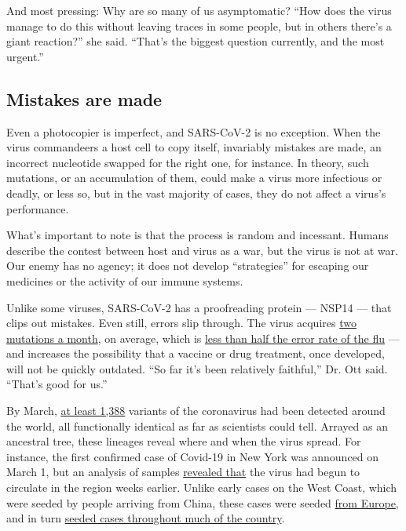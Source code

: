 And most pressing: Why are so many of us asymptomatic? ``How does the
virus manage to do this without leaving traces in some people, but in
others there's a giant reaction?'' she said. ``That's the biggest
question currently, and the most urgent.''

\hypertarget{mistakes-are-made}{%
\subsection{Mistakes are made}\label{mistakes-are-made}}

Even a photocopier is imperfect, and SARS-CoV-2 is no exception. When
the virus commandeers a host cell to copy itself, invariably mistakes
are made, an incorrect nucleotide swapped for the right one, for
instance. In theory, such mutations, or an accumulation of them, could
make a virus more infectious or deadly, or less so, but in the vast
majority of cases, they do not affect a virus's performance.

What's important to note is that the process is random and incessant.
Humans describe the contest between host and virus as a war, but the
virus is not at war. Our enemy has no agency; it does not develop
``strategies'' for escaping our medicines or the activity of our immune
systems.

Unlike some viruses, SARS-CoV-2 has a proofreading protein --- NSP14 ---
that clips out mistakes. Even still, errors slip through. The virus
acquires \href{https://bedford.io/blog/ncov-cryptic-transmission/}{two
mutations a month}, on average, which is
\href{https://jvi.asm.org/content/84/19/9733}{less than half the error
rate of the flu} --- and increases the possibility that a vaccine or
drug treatment, once developed, will not be quickly outdated. ``So far
it's been relatively faithful,'' Dr. Ott said. ``That's good for us.''

By March, \href{http://www.graphen.ai/covid.html}{at least 1,388}
variants of the coronavirus had been detected around the world, all
functionally identical as far as scientists could tell. Arrayed as an
ancestral tree, these lineages reveal where and when the virus spread.
For instance, the first confirmed case of Covid-19 in New York was
announced on March 1, but an analysis of samples
\href{https://www.nytimes.com/2020/04/08/science/new-york-coronavirus-cases-europe-genomes.htmlhttps://www.nytimes.com/2020/04/08/science/new-york-coronavirus-cases-europe-genomes.html}{revealed
that} the virus had begun to circulate in the region weeks earlier.
Unlike early cases on the West Coast, which were seeded by people
arriving from China, these cases were seeded
\href{https://nextstrain.org/narratives/ncov/sit-rep/2020-04-17?n=5}{from
Europe}, and in turn
\href{https://www.nytimes.com/2020/05/07/us/new-york-city-coronavirus-outbreak.html}{seeded
cases throughout much of the country}.

